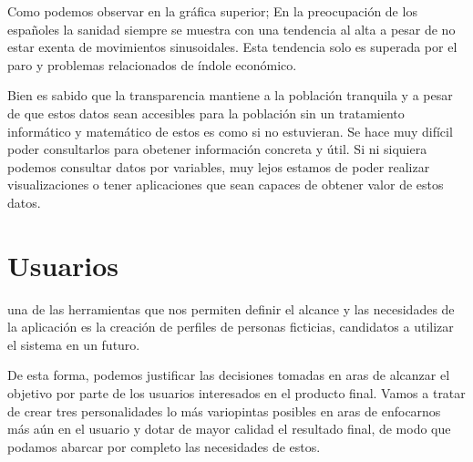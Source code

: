 Como podemos observar en la gráfica superior; En la preocupación de los españoles la sanidad siempre se muestra con una
tendencia al alta a pesar de no estar exenta de movimientos sinusoidales. Esta tendencia solo es superada por el paro y
problemas relacionados de índole económico.

Bien es sabido que la transparencia mantiene a la población tranquila y a pesar de que estos datos
sean accesibles para la población sin un tratamiento informático y matemático de estos es como si no estuvieran. Se hace
muy difícil poder consultarlos para obetener información concreta y útil. Si ni siquiera podemos consultar datos por
variables, muy lejos estamos de poder realizar visualizaciones o tener aplicaciones que sean capaces de obtener valor de
estos datos.

\section{Usuarios}
una de las herramientas que nos permiten definir el alcance y las necesidades de la aplicación es la creación de
perfiles de personas ficticias, candidatos a utilizar el sistema en un futuro.

De esta forma, podemos justificar las decisiones tomadas en aras de alcanzar el objetivo por parte de los usuarios
interesados en el producto final. Vamos a tratar de crear tres personalidades lo más variopintas posibles en aras
de enfocarnos más aún en el usuario y dotar de mayor calidad el resultado final, de modo que podamos abarcar por
completo las necesidades de estos.

